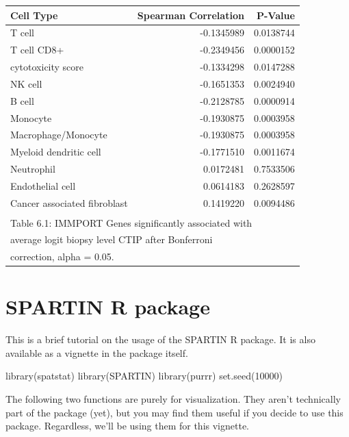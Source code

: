 \documentclass[
]{book}
\newenvironment{Shaded}{\begin{snugshade}}{\end{snugshade}}
\newcommand{\DecValTok}[1]{\textcolor[rgb]{0.00,0.00,0.81}{#1}}
\newcommand{\FunctionTok}[1]{\textcolor[rgb]{0.00,0.00,0.00}{#1}}
\newcommand{\NormalTok}[1]{#1}
\begin{document}
\begin{tabular}{l|r|r}
\hline
Cell Type & Spearman Correlation & P-Value\\
\hline
T cell & -0.1345989 & 0.0138744\\
\hline
T cell CD8+ & -0.2349456 & 0.0000152\\
\hline
cytotoxicity score & -0.1334298 & 0.0147288\\
\hline
NK cell & -0.1651353 & 0.0024940\\
\hline
B cell & -0.2128785 & 0.0000914\\
\hline
Monocyte & -0.1930875 & 0.0003958\\
\hline
Macrophage/Monocyte & -0.1930875 & 0.0003958\\
\hline
Myeloid dendritic cell & -0.1771510 & 0.0011674\\
\hline
Neutrophil & 0.0172481 & 0.7533506\\
\hline
Endothelial cell & 0.0614183 & 0.2628597\\
\hline
Cancer associated fibroblast & 0.1419220 & 0.0094486\\
\hline
\multicolumn{3}{l}{\textsuperscript{} Table 6.1: IMMPORT Genes significantly associated with}\\
\multicolumn{3}{l}{average logit biopsy level CTIP after Bonferroni}\\
\multicolumn{3}{l}{correction, alpha = 0.05.}\\
\end{tabular}

\hypertarget{spartin-r-package}{%
\chapter{SPARTIN R package}\label{spartin-r-package}}

This is a brief tutorial on the usage of the SPARTIN R package. It is also available as a vignette in the package itself.

\begin{Shaded}
\begin{Highlighting}[]
\FunctionTok{library}\NormalTok{(spatstat)}
\FunctionTok{library}\NormalTok{(SPARTIN)}
\FunctionTok{library}\NormalTok{(purrr)}
\FunctionTok{set.seed}\NormalTok{(}\DecValTok{10000}\NormalTok{)}
\end{Highlighting}
\end{Shaded}

The following two functions are purely for visualization. They aren't technically part of the package (yet), but you may find them useful if you decide to use this package. Regardless, we'll be using them for this vignette.
\end{document}
